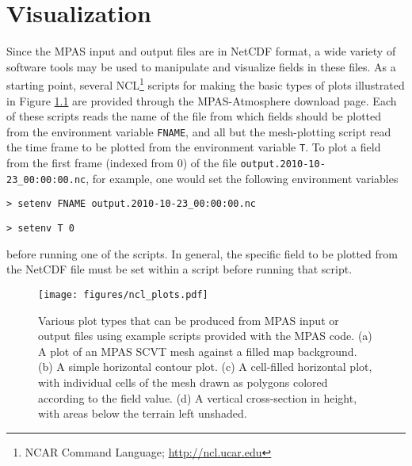 
\chapter{Visualization}
\label{chap:atmosphere_visualization}

Since the MPAS input and output files are in NetCDF format, a wide variety of software
tools may be used to manipulate and visualize fields in these files. As a starting point, several NCL\footnote{NCAR Command Language; \url{http://ncl.ucar.edu}}
scripts for making the basic types of plots illustrated in Figure \ref{fig:ncl_plots} are provided through the MPAS-Atmosphere download page. Each of
these scripts reads the name of the file from which fields should be plotted from the environment variable {\tt FNAME},
and all but the mesh-plotting script read the time frame to be plotted from the environment variable {\tt T}. To plot
a field from the first frame (indexed from 0) of the file {\tt output.2010-10-23\_00:00:00.nc}, for example, one would set the 
following environment variables 

\vspace{12pt}
{\tt > setenv FNAME output.2010-10-23\_00:00:00.nc}

{\tt > setenv T 0}
\vspace{12pt}

\noindent before running one of the scripts. In general, the specific field to be plotted from the NetCDF file must be set 
within a script before running that script. 

\begin{figure}[htb]
\begin{center}
\texttt{[image: figures/ncl\_plots.pdf]}
\caption{Various plot types that can be produced from MPAS input or output files using example scripts provided with the MPAS code.
(a) A plot of an MPAS SCVT mesh against a filled map background. (b) A simple horizontal contour plot. (c) A cell-filled horizontal plot, with
individual cells of the mesh drawn as polygons colored according to the field value. (d) A vertical cross-section in height, with areas below the
terrain left unshaded.}
\label{fig:ncl_plots}
\end{center}
\end{figure}


